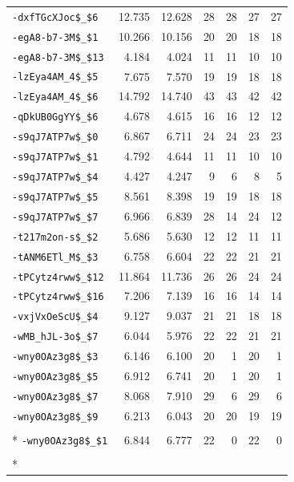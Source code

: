 \begin{longtable}{lrrrrrr}
\nolinkurl{-dxfTGcXJoc$_$6} & 12.735 & 12.628 & 28 & 28 & 27 & 27\\
\nolinkurl{-egA8-b7-3M$_$1} & 10.266 & 10.156 & 20 & 20 & 18 & 18\\
\nolinkurl{-egA8-b7-3M$_$13} & 4.184 & 4.024 & 11 & 11 & 10 & 10\\
\nolinkurl{-lzEya4AM_4$_$5} & 7.675 & 7.570 & 19 & 19 & 18 & 18\\
\nolinkurl{-lzEya4AM_4$_$6} & 14.792 & 14.740 & 43 & 43 & 42 & 42\\
\nolinkurl{-qDkUB0GgYY$_$6} & 4.678 & 4.615 & 16 & 16 & 12 & 12\\
\nolinkurl{-s9qJ7ATP7w$_$0} & 6.867 & 6.711 & 24 & 24 & 23 & 23\\
\nolinkurl{-s9qJ7ATP7w$_$1} & 4.792 & 4.644 & 11 & 11 & 10 & 10\\
\nolinkurl{-s9qJ7ATP7w$_$4} & 4.427 & 4.247 & 9 & 6 & 8 & 5\\
\nolinkurl{-s9qJ7ATP7w$_$5} & 8.561 & 8.398 & 19 & 19 & 18 & 18\\
\nolinkurl{-s9qJ7ATP7w$_$7} & 6.966 & 6.839 & 28 & 14 & 24 & 12\\
\nolinkurl{-t217m2on-s$_$2} & 5.686 & 5.630 & 12 & 12 & 11 & 11\\
\nolinkurl{-tANM6ETl_M$_$3} & 6.758 & 6.604 & 22 & 22 & 21 & 21\\
\nolinkurl{-tPCytz4rww$_$12} & 11.864 & 11.736 & 26 & 26 & 24 & 24\\
\nolinkurl{-tPCytz4rww$_$16} & 7.206 & 7.139 & 16 & 16 & 14 & 14\\
\nolinkurl{-vxjVxOeScU$_$4} & 9.127 & 9.037 & 21 & 21 & 18 & 18\\
\nolinkurl{-wMB_hJL-3o$_$7} & 6.044 & 5.976 & 22 & 22 & 21 & 21\\
\nolinkurl{-wny0OAz3g8$_$3} & 6.146 & 6.100 & 20 & 1 & 20 & 1\\
\nolinkurl{-wny0OAz3g8$_$5} & 6.912 & 6.741 & 20 & 1 & 20 & 1\\
\nolinkurl{-wny0OAz3g8$_$7} & 8.068 & 7.910 & 29 & 6 & 29 & 6\\
\nolinkurl{-wny0OAz3g8$_$9} & 6.213 & 6.043 & 20 & 20 & 19 & 19\\
\addlinespace[0.5em]
\multicolumn{7}{l}{\textbf{3. 全部词通过对齐筛选，但视觉模态不可观测（1条）}}\\*
\nolinkurl{-wny0OAz3g8$_$1} & 6.844 & 6.777 & 22 & 0 & 22 & 0\\
\addlinespace[0.5em]
\multicolumn{7}{l}{\textbf{4. 整段对齐受限（已完成人工审核）（21条）}}\\*

\end{longtable}
